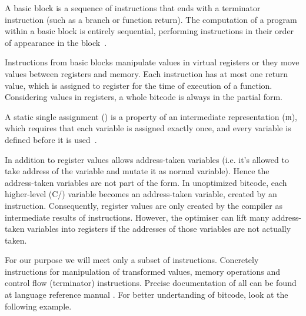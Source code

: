 \begin{definition}\label{def:basicblock}
A basic block is a sequence of instructions that ends with a terminator
instruction (such as a branch or function return). The computation of a program
within a basic block is entirely sequential, performing instructions in their
order of appearance in the block~\cite{Rockai15}.
\end{definition}

Instructions from basic blocks manipulate values in virtual registers or
they move values between registers and memory. Each instruction has at most one
return value, which is assigned to register for the time of execution of a
function. Considering values in registers, a whole \LLVM bitcode is always in the
partial \SSA form.

\begin{definition}\label{def:ssa}
A static single assignment (\SSA{}) is a property of an intermediate representation
(\textsc{ir}), which requires that each variable is assigned exactly once, and every
variable is defined before it is used~\cite{Cytron91}.
\end{definition}

In addition to register values \LLVMIR allows address-taken variables (i.e. it's
allowed to take address of the variable and mutate it as normal variable).
Hence the address-taken variables are not part of the \SSA form. In unoptimized
\LLVM bitcode, each higher-level (C/\Cpp{}) variable becomes an address-taken
variable, created by an  instruction. Consequently, register values are only
created by the compiler as intermediate results of instructions. However, the \LLVM
optimiser can lift many address-taken variables into registers if the addresses
of those variables are not actually taken.

For our purpose we will meet only a subset of \LLVM instructions. Concretely
instructions for manipulation of transformed values, memory operations and
control flow (terminator) instructions. Precise documentation of all can be
found at \LLVM language reference manual \cite{LLVM:langref}. For better
undertanding of \LLVM bitcode, look at the following example.


